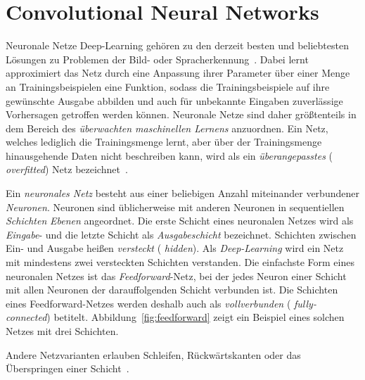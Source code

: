 \section{Convolutional Neural Networks}
\label{convolutional_neural_networks}

Neuronale Netze \bzw{} Deep-Learning gehören zu den derzeit besten und beliebtesten Lösungen zu Problemen der Bild- oder Spracherkennung~\cite{Nielsen}.
Dabei lernt \bzw{} approximiert das Netz durch eine Anpassung ihrer Parameter über einer Menge an Trainingsbeispielen eine Funktion, sodass die Trainingsbeispiele auf ihre gewünschte Ausgabe abbilden und auch für unbekannte Eingaben zuverlässige Vorhersagen getroffen werden können.
Neuronale Netze sind daher größtenteils in dem Bereich des \emph{überwachten maschinellen Lernens} anzuordnen.
Ein Netz, welches lediglich die Trainingsmenge lernt, aber über der Trainingsmenge hinausgehende Daten nicht beschreiben kann, wird als ein \emph{überangepasstes} (\engl{} \emph{overfitted}) Netz bezeichnet~\cite{Nielsen}.

Ein \emph{neuronales Netz} besteht aus einer beliebigen Anzahl miteinander verbundener \emph{Neuronen}.
Neuronen sind üblicherweise mit anderen Neuronen in sequentiellen \emph{Schichten} \bzw{} \emph{Ebenen} angeordnet.
Die erste Schicht eines neuronalen Netzes wird als \emph{Eingabe}- und die letzte Schicht als  \emph{Ausgabeschicht} bezeichnet.
Schichten zwischen Ein- und Ausgabe heißen \emph{versteckt} (\engl{} \emph{hidden}).
Als \emph{Deep-Learning} wird ein Netz mit mindestens zwei versteckten Schichten verstanden.
Die einfachste Form eines neuronalen Netzes ist das \emph{Feedforward}-Netz, bei der jedes Neuron einer Schicht mit allen Neuronen der darauffolgenden Schicht verbunden ist.
Die Schichten eines Feedforward-Netzes werden deshalb auch als \emph{vollverbunden} (\engl{} \emph{fully-connected}) betitelt.
Abbildung~\ref{fig:feedforward} zeigt ein Beispiel eines solchen Netzes mit drei Schichten.

Andere Netzvarianten erlauben \zB{} Schleifen, Rückwärtskanten oder das Überspringen einer Schicht~\cite{Nielsen}.

